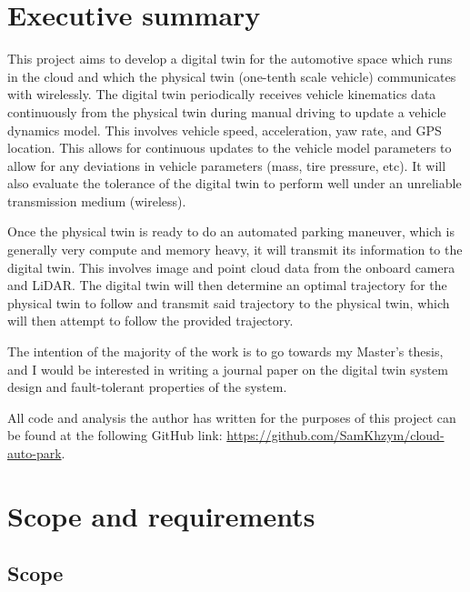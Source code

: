 \section{Executive summary}


This project aims to develop a digital twin for the automotive space which runs in the cloud and which the physical twin (one-tenth scale vehicle) communicates with wirelessly. The digital twin periodically receives vehicle kinematics data continuously from the physical twin during manual driving to update a vehicle dynamics model. This involves vehicle speed, acceleration, yaw rate, and GPS location. This allows for continuous updates to the vehicle model parameters to allow for any deviations in vehicle parameters (mass, tire pressure, etc). It will also evaluate the tolerance of the digital twin to perform well under an unreliable transmission medium (wireless).

Once the physical twin is ready to do an automated parking maneuver, which is generally very compute and memory heavy, it will transmit its information to the digital twin. This involves image and point cloud data from the onboard camera and LiDAR. The digital twin will then determine an optimal trajectory for the physical twin to follow and transmit said trajectory to the physical twin, which will then attempt to follow the provided trajectory.

The intention of the majority of the work is to go towards my Master's thesis, and I would be interested in writing a journal paper on the digital twin system design and fault-tolerant properties of the system.

All code and analysis the author has written for the purposes of this project can be found at the following GitHub link: \url{https://github.com/SamKhzym/cloud-auto-park}.

\section{Scope and requirements}

\subsection{Scope}

